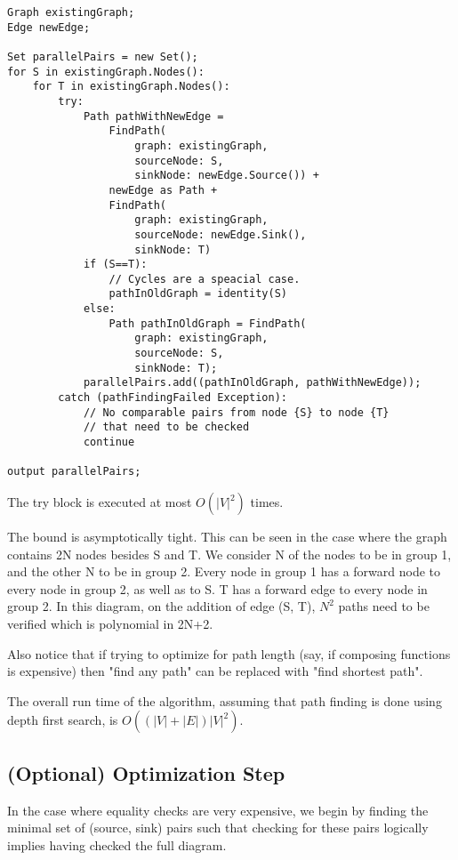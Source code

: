 \documentclass{article}
\begin{document}
\begin{verbatim}
Graph existingGraph;
Edge newEdge;

Set parallelPairs = new Set();
for S in existingGraph.Nodes():
    for T in existingGraph.Nodes():
        try:
            Path pathWithNewEdge = 
                FindPath(
                    graph: existingGraph, 
                    sourceNode: S,
                    sinkNode: newEdge.Source()) +
                newEdge as Path +
                FindPath(
                    graph: existingGraph, 
                    sourceNode: newEdge.Sink(), 
                    sinkNode: T)
            if (S==T):
                // Cycles are a speacial case.
                pathInOldGraph = identity(S)
            else:
                Path pathInOldGraph = FindPath(
                    graph: existingGraph, 
                    sourceNode: S, 
                    sinkNode: T);
            parallelPairs.add((pathInOldGraph, pathWithNewEdge));
        catch (pathFindingFailed Exception):
            // No comparable pairs from node {S} to node {T} 
            // that need to be checked
            continue

output parallelPairs;
\end{verbatim}

The try block is executed at most $O(|V|^2)$ times.

The bound is asymptotically tight. This can be seen in the case where the graph contains 2N nodes besides S and T. We consider N of the nodes to be in group 1, and the other N to be in group 2. Every node in group 1 has a forward node to every node in group 2, as well as to S. T has a forward edge to every node in group 2. In this diagram, on the addition of edge (S, T), $N^2$ paths need to be verified which is polynomial in 2N+2.

Also notice that if trying to optimize for path length (say, if composing functions is expensive) then "find any path" can be replaced with "find shortest path".

The overall run time of the algorithm, assuming that path finding is done using depth first search, is $O((|V|+|E|)|V|^2)$.

\subsection{(Optional) Optimization Step}

In the case where equality checks are very expensive, we begin by finding the minimal set of (source, sink) pairs such that checking for these pairs logically implies having checked the full diagram.
\end{document}
